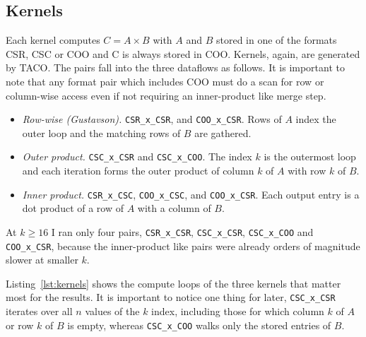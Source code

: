 \subsection{Kernels}
Each kernel computes $C=A\times B$ with $A$ and $B$ stored in one of the formats CSR, CSC or COO and C is always stored in COO. Kernels, again, are generated by TACO. The pairs fall into the three dataflows as follows. It is important to note that any format pair which includes COO must do a scan for row or
column-wise access even if not requiring an inner-product like merge step.

\begin{itemize}
  \item \emph{Row-wise (Gustavson).} \texttt{CSR\_x\_CSR}, and \texttt{COO\_x\_CSR}. Rows of $A$ index the outer loop and the matching rows of $B$ are gathered.
  \item \emph{Outer product.} \texttt{CSC\_x\_CSR} and \texttt{CSC\_x\_COO}. The index $k$ is the outermost loop and each iteration forms the outer product of column $k$ of $A$ with row $k$ of $B$.
  \item \emph{Inner product.} \texttt{CSR\_x\_CSC}, \texttt{COO\_x\_CSC}, and \texttt{COO\_x\_CSR}. Each output entry is a dot product of a row of $A$ with a column of $B$.
\end{itemize}

At $k\ge 16$ I ran only four pairs, \texttt{CSR\_x\_CSR}, \texttt{CSC\_x\_CSR}, \texttt{CSC\_x\_COO} and \texttt{COO\_x\_CSR}, because the inner-product like pairs were already orders of magnitude slower at smaller $k$.

Listing~\ref{lst:kernels} shows the compute loops of the three kernels that matter most for the results. It is important to notice one thing for later, \texttt{CSC\_x\_CSR} iterates over all $n$ values of the $k$ index, including those for which column $k$ of $A$ or row $k$ of $B$ is empty, whereas \texttt{CSC\_x\_COO} walks only the stored entries of $B$.

